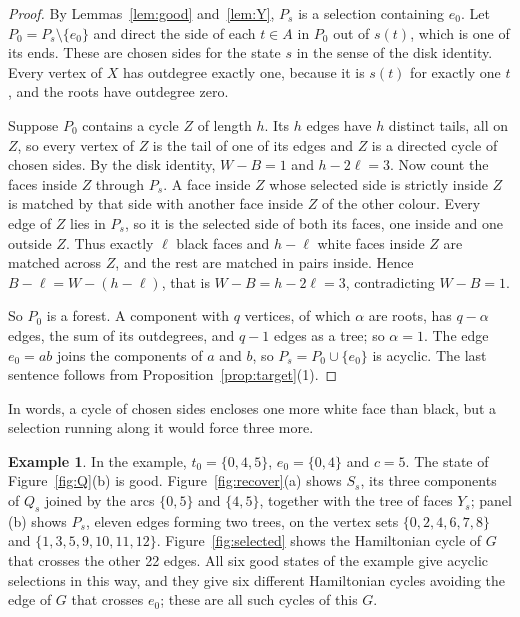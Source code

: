 \documentclass[10pt]{amsart}
\numberwithin{equation}{section}
\theoremstyle{definition}
\newtheorem{example}[equation]{Example}
\theoremstyle{remark}
\begin{document}
\begin{proof}
By Lemmas~\ref{lem:good} and~\ref{lem:Y}, $P_s$ is a selection containing $e_0$.
Let $P_0=P_s\setminus\{e_0\}$ and direct the side of each $t\in A$ in $P_0$ out of $s(t)$, which is one of its ends.
These are chosen sides for the state $s$ in the sense of the disk identity.
Every vertex of $X$ has outdegree exactly one, because it is $s(t)$ for exactly one $t$, and the roots have outdegree zero.

Suppose $P_0$ contains a cycle $Z$ of length $h$.
Its $h$ edges have $h$ distinct tails, all on $Z$, so every vertex of $Z$ is the tail of one of its edges and $Z$ is a directed cycle of chosen sides.
By the disk identity, $W-B=1$ and $h-2\ell=3$.
Now count the faces inside $Z$ through $P_s$.
A face inside $Z$ whose selected side is strictly inside $Z$ is matched by that side with another face inside $Z$ of the other colour.
Every edge of $Z$ lies in $P_s$, so it is the selected side of both its faces, one inside and one outside $Z$.
Thus exactly $\ell$ black faces and $h-\ell$ white faces inside $Z$ are matched across $Z$, and the rest are matched in pairs inside.
Hence $B-\ell=W-(h-\ell)$, that is $W-B=h-2\ell=3$, contradicting $W-B=1$.

So $P_0$ is a forest.
A component with $q$ vertices, of which $\alpha$ are roots, has $q-\alpha$ edges, the sum of its outdegrees, and $q-1$ edges as a tree; so $\alpha=1$.
The edge $e_0=ab$ joins the components of $a$ and $b$, so $P_s=P_0\cup\{e_0\}$ is acyclic.
The last sentence follows from Proposition~\ref{prop:target}(1).
\end{proof}

In words, a cycle of chosen sides encloses one more white face than black, but a selection running along it would force three more.

\begin{example}\label{ex:recover}
In the example, $t_0=\{0,4,5\}$, $e_0=\{0,4\}$ and $c=5$.
The state of Figure~\ref{fig:Q}(b) is good.
Figure~\ref{fig:recover}(a) shows $S_s$, its three components of $Q_s$ joined by the arcs $\{0,5\}$ and $\{4,5\}$, together with the tree of faces $Y_s$; panel (b) shows $P_s$, eleven edges forming two trees, on the vertex sets $\{0,2,4,6,7,8\}$ and $\{1,3,5,9,10,11,12\}$.
Figure~\ref{fig:selected} shows the Hamiltonian cycle of $G$ that crosses the other 22 edges.
All six good states of the example give acyclic selections in this way, and they give six different Hamiltonian cycles avoiding the edge of $G$ that crosses $e_0$; these are all such cycles of this $G$.
\end{example}
\end{document}

